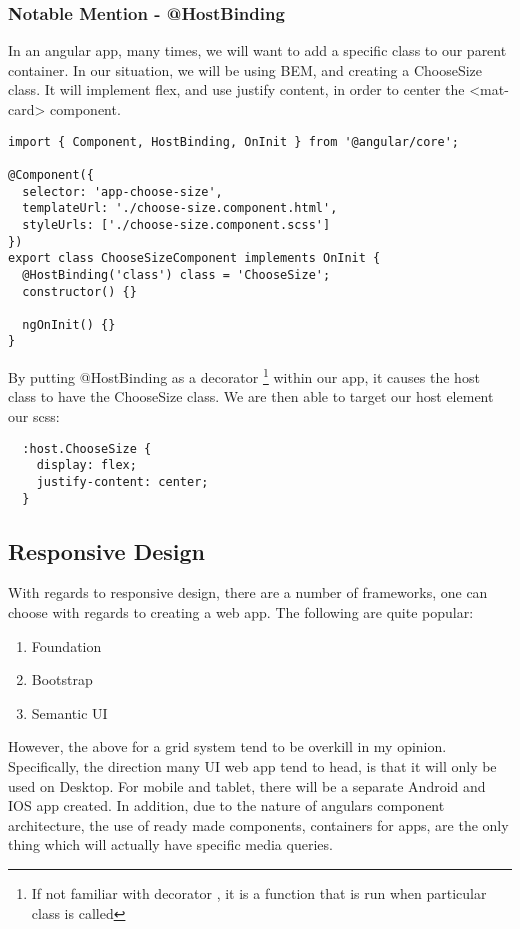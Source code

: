 \subsubsection{ Notable Mention - @HostBinding }
In an angular app, many times, we will want to add a specific class to our
parent container. In our situation, we will be using BEM, and creating a
ChooseSize class. It will implement flex, and use justify content, in order to
center the <mat-card> component.

\begin{lstlisting}[caption=My Javascript Example]
import { Component, HostBinding, OnInit } from '@angular/core';

@Component({
  selector: 'app-choose-size',
  templateUrl: './choose-size.component.html',
  styleUrls: ['./choose-size.component.scss']
})
export class ChooseSizeComponent implements OnInit {
  @HostBinding('class') class = 'ChooseSize';
  constructor() {}

  ngOnInit() {}
}
\end{lstlisting}

By putting @HostBinding as a decorator \footnote{If not familiar with decorator
, it is a function that is run when particular class is called} within our app,
it causes the host class to have the ChooseSize class. We are then able to
target our host element our scss:
\begin{verbatim}
  :host.ChooseSize {
    display: flex;
    justify-content: center;
  }
\end{verbatim}

\subsection{ Responsive Design }
With regards to responsive design, there are a number of frameworks, one can
choose with regards to creating a web app. The following are quite popular:
\begin{enumerate}
  \item Foundation
  \item Bootstrap
  \item Semantic UI
\end{enumerate}

However, the above for a grid system tend to be overkill in my opinion.
Specifically, the direction many UI web app tend to head, is that it will only
be used on Desktop. For mobile and tablet, there will be a separate Android and
IOS app created. In addition, due to the nature of angulars component
architecture, the use of ready made components, containers for apps, are the
only thing which will actually have specific media queries.

